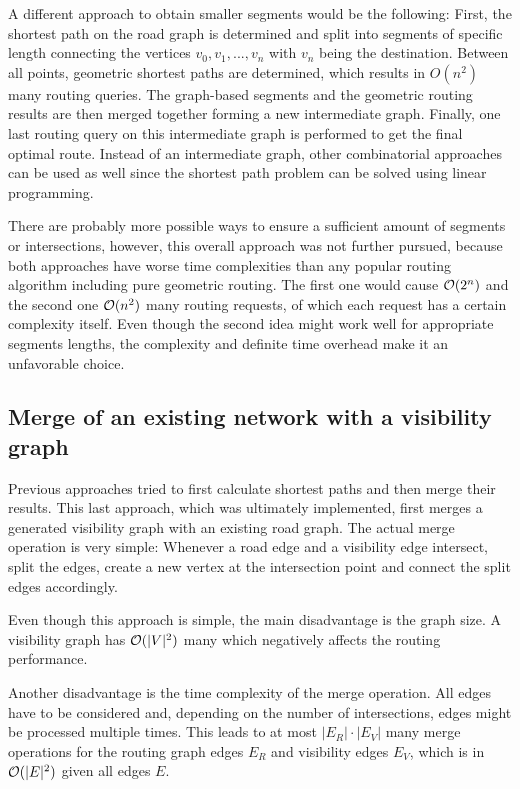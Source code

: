 		A different approach to obtain smaller segments would be the following:
		First, the shortest path on the road graph is determined and split into segments of specific length connecting the vertices $v_0, v_1, ..., v_n$ with $v_n$ being the destination.
		Between all points, geometric shortest paths are determined, which results in $O(n^2)$ many routing queries.
		The graph-based segments and the geometric routing results are then merged together forming a new intermediate graph.
		Finally, one last routing query on this intermediate graph is performed to get the final optimal route.
		Instead of an intermediate graph, other combinatorial approaches can be used as well since the shortest path problem can be solved using linear programming\cite{handler-zang-lp-duality}.
		
		There are probably more possible ways to ensure a sufficient amount of segments or intersections, however, this overall approach was not further pursued, because both approaches have worse time complexities than any popular routing algorithm including pure geometric routing.
		The first one would cause $\mathcal{O}(2^n)$ and the second one $\mathcal{O}(n^2)$ many routing requests, of which each request has a certain complexity itself.
		Even though the second idea might work well for appropriate segments lengths, the complexity and definite time overhead make it an unfavorable choice.
	
	\subsection{Merge of an existing network with a visibility graph}
	
		Previous approaches tried to first calculate shortest paths and then merge their results.
		This last approach, which was ultimately implemented, first merges a generated visibility graph with an existing road graph.
		The actual merge operation is very simple:
		Whenever a road edge and a visibility edge intersect, split the edges, create a new vertex at the intersection point and connect the split edges accordingly.
		
		Even though this approach is simple, the main disadvantage is the graph size.
		A visibility graph has $\mathcal{O}(|V|^2)$ many which negatively affects the routing performance.
		
		Another disadvantage is the time complexity of the merge operation.
		All edges have to be considered and, depending on the number of intersections, edges might be processed multiple times.
		This leads to at most $|E_R| \cdot |E_V|$ many merge operations for the routing graph edges $E_R$ and visibility edges $E_V$, which is in $\mathcal{O}(|E|^2)$ given all edges $E$.
		
